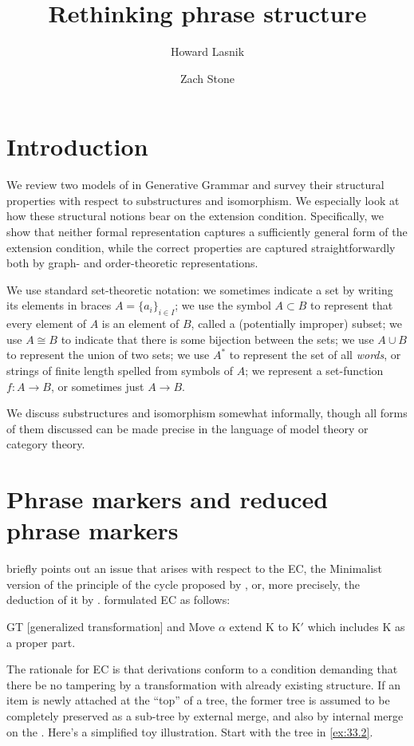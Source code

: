 \documentclass[output=paper]{langsci/langscibook}
\author{Howard Lasnik\affiliation{University of Maryland at College Park}\and Zach Stone\affiliation{University of Maryland at College Park}}
\title{Rethinking phrase structure}
\begin{document}
\glsresetall

\section{Introduction}

We review two models of  in Generative Grammar and survey their
structural properties with respect to substructures and isomorphism. We
especially look at how these structural notions bear on the extension
condition. Specifically, we show that neither formal representation captures a
sufficiently general form of the extension condition, while the correct
properties are captured straightforwardly both by graph- and order-theoretic
representations.

We use standard set-theoretic notation: we sometimes indicate a set by writing
its elements  in braces $A=\{a_i\}_{i\in I}$; we use the symbol $A\subset B$ to
represent that every element of $A$ is an element of $B$, called a (potentially
improper) subset; we use $A\cong B$ to indicate that there is some bijection
between the sets; we use $A\cup B$ to represent the union of two sets; we use
$A^*$ to represent the set of all \emph{words}, or strings of finite length
spelled from symbols of $A$; we represent a set-function $f:A\rightarrow B$, or
sometimes just $A\rightarrow B$.

We discuss substructures and isomorphism somewhat informally, though all forms
of them discussed can be made precise in the language of model theory or
category theory.

\section{Phrase markers and reduced phrase markers}

\citet{conceptions} briefly points out an issue that arises with respect to the
\gls{EC}, the Minimalist version of the principle of the cycle proposed by
\citet{Chomsky1993}, or, more precisely, the deduction of it by
\citet{Chomsky2000}. \textcite[22]{Chomsky1993} formulated \gls{EC} as follows:

\ea\label{ex:33.1} GT [generalized
    transformation] and Move $\alpha$ extend K to K$'$ which includes K
    as a proper part.
\z

The \textcite{Chomsky2000} rationale for \gls{EC} is that derivations conform to a
condition demanding that there be no tampering by a transformation with already
existing structure. If an item is newly attached at the \enquote{top} of a tree, the
former tree is assumed to be completely preserved as a sub-tree by external
merge, and also by internal merge on the . Here's a
simplified toy illustration. Start with the tree in \eqref{ex:33.2}.
\end{document}
